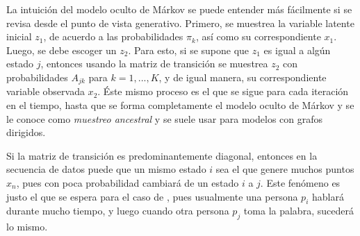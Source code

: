 La intuición del modelo oculto de Márkov se puede entender más fácilmente si se revisa desde el punto de
vista generativo. Primero, se muestrea la variable latente inicial $z_1$, de acuerdo a las probabilidades 
$\pi_k$, así como su correspondiente $x_1$. Luego, se debe escoger un $z_2$. Para esto, si se supone que 
$z_1$ es igual a algún estado $j$, entonces usando la matriz de transición se muestrea $z_2$ con probabilidades 
$A_{jk}$ para $k = 1, ... , K$, y de igual manera, su correspondiente variable observada $x_2$. Éste mismo
proceso es el que se sigue para cada iteración en el tiempo, hasta que se forma completamente el modelo 
oculto de Márkov y se le conoce como \textit{muestreo ancestral} y se suele usar para modelos con grafos dirigidos.

Si la matriz de transición es predominantemente diagonal, entonces en la secuencia de datos puede que un mismo 
estado $i$ sea el que genere muchos puntos $x_n$, pues con poca probabilidad cambiará de un estado $i$ a $j$. 
Este fenómeno es justo el que se espera para el caso de \sd, pues usualmente una persona $p_i$ hablará
durante mucho tiempo, y luego cuando otra persona $p_j$ toma la palabra, sucederá lo mismo.
